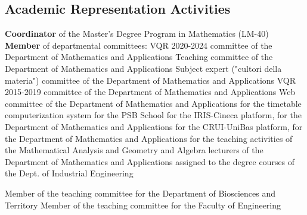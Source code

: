 \documentclass[11pt,a4paper,sans,colorlinks,linkcolor=green]{moderncv}
\begin{document}
\subsection{{Academic Representation Activities}}
 {\textbf{Coordinator} of the Master's Degree Program in Mathematics (LM-40)}
\cvitem{} {\textbf{Member} of departmental committees:}
 {VQR 2020-2024 committee of the Department of Mathematics and Applications}
 {Teaching committee of the Department of Mathematics and Applications}
 {Subject expert ("cultori della materia") committee of the Department of Mathematics and Applications}
 {VQR 2015-2019 committee of the Department of Mathematics and Applications}
 {Web committee of the Department of Mathematics and Applications}
 {for the timetable computerization system for the PSB School}
 {for the IRIS-Cineca platform, for the Department of Mathematics and Applications}
 {for the CRUI-UniBas platform, for the Department of Mathematics and Applications}
 {for the teaching activities of the Mathematical Analysis and Geometry and Algebra lecturers of the Department of Mathematics and Applications assigned to the degree courses of the Dept. of Industrial Engineering}


 {Member of the teaching committee for the Department of Biosciences and Territory}
 {Member of the teaching committee for the Faculty of Engineering}
\end{document}

